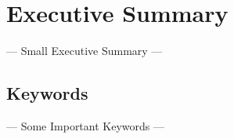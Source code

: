 \section*{Executive Summary}

--- Small Executive Summary --- 

\subsection*{Keywords}

--- Some Important Keywords ---

\newpage